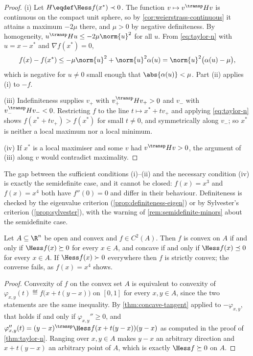 \begin{proof}
	(i) Let $H\eqdef\Hess f(x^\ast)\prec0$. The function $v\mapsto v^{\transp}Hv$
	is continuous on the compact unit sphere, so by
	\autoref{cor:weierstrass-continuous} it attains a maximum $-2\mu$ there, and
	$\mu>0$ by negative definiteness. By homogeneity,
	$u^{\transp}Hu\leq-2\mu\norm{u}^2$ for all $u$. From \eqref{eq:taylor-n} with
	$u=x-x^\ast$ and $\nabla f(x^\ast)=0$,
	\[
		f(x)-f(x^\ast)\leq-\mu\norm{u}^2+\norm{u}^2\alpha(u)
		=\norm{u}^2\bigl(\alpha(u)-\mu\bigr),
	\]
	which is negative for $u\neq0$ small enough that $\abs{\alpha(u)}<\mu$. Part
	(ii) applies (i) to $-f$.

	(iii) Indefiniteness supplies $v_+$ with $v_+^{\transp}Hv_+>0$ and $v_-$ with
	$v_-^{\transp}Hv_-<0$. Restricting $f$ to the line $t\mapsto x^\ast+tv_+$ and
	applying \eqref{eq:taylor-n} shows $f(x^\ast+tv_+)>f(x^\ast)$ for small
	$t\neq0$, and symmetrically along $v_-$; so $x^\ast$ is neither a local maximum
	nor a local minimum.

	(iv) If $x^\ast$ is a local maximiser and some $v$ had $v^{\transp}Hv>0$, the
	argument of (iii) along $v$ would contradict maximality.
\end{proof}

The gap between the sufficient conditions (i)--(ii) and the necessary condition
(iv) is exactly the semidefinite case, and it cannot be closed:
$f(x)=x^3$ and $f(x)=x^4$ both have $f''(0)=0$ and differ in their behaviour.
Definiteness is checked by the eigenvalue criterion
(\autoref{prop:definiteness-eigen}) or by Sylvester's criterion
(\autoref{prop:sylvester}), with the warning of
\autoref{rem:semidefinite-minors} about the semidefinite case.

\begin{theorem}\label{thm:hessian-convexity}
	Let $A\subseteq\R^n$ be open and convex and $f\in C^2(A)$. Then $f$ is convex
	on $A$ if and only if $\Hess f(x)\succeq0$ for every $x\in A$, and concave if
	and only if $\Hess f(x)\preceq0$ for every $x\in A$. If $\Hess f(x)\succ0$
	everywhere then $f$ is strictly convex; the converse fails, as $f(x)=x^4$
	shows.
\end{theorem}

\begin{proof}
	Convexity of $f$ on the convex set $A$ is equivalent to convexity of
	$\varphi_{x,y}(t)\eqdef f\bigl(x+t(y-x)\bigr)$ on $[0,1]$ for every
	$x,y\in A$, since the two statements are the same inequality. By
	\autoref{thm:concave-tangent} applied to $-\varphi_{x,y}$, that holds if and
	only if $\varphi_{x,y}''\geq0$, and
	$\varphi_{x,y}''(t)=(y-x)^{\transp}\Hess f(x+t(y-x))(y-x)$ as computed in the
	proof of \autoref{thm:taylor-n}. Ranging over $x,y\in A$ makes $y-x$ an
	arbitrary direction and $x+t(y-x)$ an arbitrary point of $A$, which is exactly
	$\Hess f\succeq0$ on $A$.
\end{proof}

